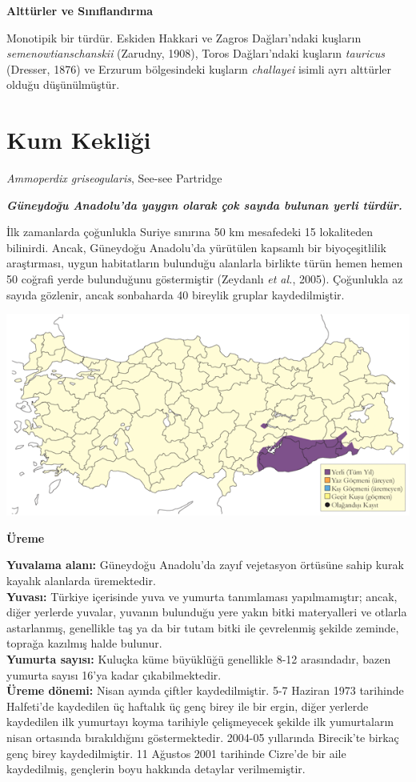 \documentclass[
  a4paper,
  DIV=11,
  numbers=noendperiod]{scrreprt}
\begin{document}
\textbf{Alttürler ve Sınıflandırma}

Monotipik bir türdür. Eskiden Hakkari ve Zagros Dağları'ndaki kuşların
\emph{semenowtianschanskii} (Zarudny, 1908), Toros Dağları'ndaki
kuşların \emph{tauricus} (Dresser, 1876) ve Erzurum bölgesindeki
kuşların \emph{challayei} isimli ayrı alttürler olduğu düşünülmüştür.

\section{Kum Kekliği}\label{kum-kekliux11fi}

\emph{Ammoperdix griseogularis}, See-see Partridge

\textbf{\emph{Güneydoğu Anadolu'da yaygın olarak çok sayıda bulunan
yerli türdür.}}

İlk zamanlarda çoğunlukla Suriye sınırına 50 km mesafedeki 15
lokaliteden bilinirdi. Ancak, Güneydoğu Anadolu'da yürütülen kapsamlı
bir biyoçeşitlilik araştırması, uygun habitatların bulunduğu alanlarla
birlikte türün hemen hemen 50 coğrafi yerde bulunduğunu göstermiştir
(Zeydanlı \emph{et al.}, 2005). Çoğunlukla az sayıda gözlenir, ancak
sonbaharda 40 bireylik gruplar kaydedilmiştir.

\includegraphics{images/harita_Page_040.png}

\textbf{Üreme}

\textbf{Yuvalama alanı:} Güneydoğu Anadolu'da zayıf vejetasyon örtüsüne
sahip kurak kayalık alanlarda üremektedir.\\
\textbf{Yuvası:} Türkiye içerisinde yuva ve yumurta tanımlaması
yapılmamıştır; ancak, diğer yerlerde yuvalar, yuvanın bulunduğu yere
yakın bitki materyalleri ve otlarla astarlanmış, genellikle taş ya da
bir tutam bitki ile çevrelenmiş şekilde zeminde, toprağa kazılmış halde
bulunur.\\
\textbf{Yumurta sayısı:} Kuluçka küme büyüklüğü genellikle 8-12
arasındadır, bazen yumurta sayısı 16'ya kadar çıkabilmektedir.\\
\textbf{Üreme dönemi:} Nisan ayında çiftler kaydedilmiştir. 5-7 Haziran
1973 tarihinde Halfeti'de kaydedilen üç haftalık üç genç birey ile bir
ergin, diğer yerlerde kaydedilen ilk yumurtayı koyma tarihiyle
çelişmeyecek şekilde ilk yumurtaların nisan ortasında bırakıldığını
göstermektedir. 2004-05 yıllarında Birecik'te birkaç genç birey
kaydedilmiştir. 11 Ağustos 2001 tarihinde Cizre'de bir aile kaydedilmiş,
gençlerin boyu hakkında detaylar verilmemiştir.
\end{document}
